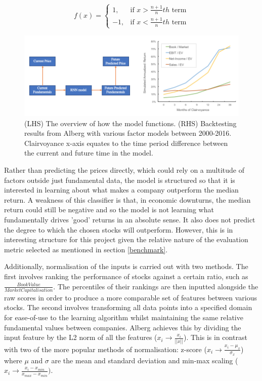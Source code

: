 \documentclass[10pt,onecolumn,letterpaper]{article}
\begin{document}
\[f(x)= 
\begin{cases}
	1,& \text{if } x > \frac{n+1}{n}th\text{ term}\\
    	-1,& \text{if } x < \frac{n+1}{n}th\text{ term}
\end{cases}
\]

\begin{figure}[!hbt!]
\centering
\includegraphics[width=14.5cm]{alberg_intro.png}
\caption{(LHS) The overview of how the model functions. (RHS) Backtesting results from Alberg with various factor models between 2000-2016. Clairvoyance x-axis equates to the time period difference between the current and future time in the model. }
\end{figure}

Rather than predicting the prices directly, which could rely on a multitude of factors outside just fundamental data, the model is structured so that it is interested in learning about what makes a company outperform the median return. A weakness of this classifier is that, in economic downturns, the median return could still be negative and so the model is not learning what fundamentally drives 'good' returns in an absolute sense. It also does not predict the degree to which the chosen stocks will outperform. However, this is in interesting structure for this project given the relative nature of the evaluation metric selected as mentioned in section \ref{benchmark}.

Additionally, normalisation of the inputs is carried out with two methods. The first involves ranking the performance of stocks against a certain ratio, such as $\frac{Book Value}{Market Capitalisation}$. The percentiles of their rankings are then inputted alongside the raw scores in order to produce a more comparable set of features between various stocks. The second involves transforming all data points into a specified domain for ease-of-use to the learning algorithm whilst maintaining the same relative fundamental values between companies. Alberg achieves this by dividing the input feature by the L2 norm of all the features ($x_{i} \rightarrow \frac{x_{i}}{||x||}$). This is in contrast with two of the more popular methods of normalisation: z-score ($x_{i} \rightarrow \frac{x_{i}-\mu_{x}}{\sigma_{x}}$) where $\mu$ and $\sigma$ are the mean and standard deviation and min-max scaling ($x_{i} \rightarrow \frac{x_{i}-x_{min}}{x_{max}-x_{min}})$.
\end{document}
